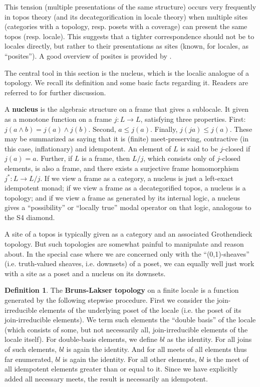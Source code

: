 \documentclass[hoptionsi,review,screen,format=acmsmall]{acmart}
\theoremstyle{definition}
\newtheorem{definition}{Definition}[section]
\begin{document}
This tension (multiple presentations of the same structure) occurs very frequently in topos theory (and its decategorification in locale theory) when multiple sites (categories with a topology, resp. posets with a coverage) can present the same topos (resp. locale). This suggests that a tighter correspondence should not be to locales directly, but rather to their presentations as sites (known, for locales, as ``posites''). A good overview of posites is provided by \cite{schultz2017temporal}.

The central tool in this section is the nucleus, which is the localic analogue of a topology. We recall its definition and some basic facts regarding it. Readers are referred to \cite{johnstone1982stone, vickers1996topology} for further discussion.

A \textbf{nucleus} is the algebraic structure on a frame that gives a sublocale. It given as a monotone function on a frame \(j : L \rightarrow L\), satisfying three properties. First: \(j(a \wedge b) = j(a) \wedge j(b)\). Second, \(a \le j(a)\). Finally, \(j(ja) \le j(a)\). These may be summarized as saying that it is (finite) meet-preserving, contractive (in this case, inflationary) and idempotent. An element of \(L\) is said to be \(j\)-closed if \(j(a)=a\). Further, if \(L\) is a frame, then \(L/j\), which consists only of \(j\)-closed elements, is also a frame, and there exists a surjective frame homomorphism \(j^* : L \rightarrow L/j\). If we view a frame as a category, a nucleus is just a left-exact idempotent monad; if we view a frame as a decategorified topos, a nucleus is a topology; and if we view a frame as generated by its internal logic, a nucleus gives a ``possibility'' or ``locally true'' modal operator on that logic, analogous to the S4 diamond.

A site of a topos is typically given as a category and an associated Grothendieck topology. But such topologies are somewhat painful to manipulate and reason about. In the special case where we are concerned only with the ``(0,1)-sheaves'' (i.e. truth-valued sheaves, i.e. downsets) of a poset, we can equally well just work with a site as a poset and a nucleus on its downsets.

\begin{definition}
The \textbf{Bruns-Lakser topology} on a finite locale is a function generated by the following stepwise procedure. First we consider the join-irreducible elements of the underlying poset of the locale (i.e. the poset of its join-irreducible elements). We term such elements the ``double basis'' of the locale (which consists of some, but not necessarily all, join-irreducible elements of the locale itself). For double-basis elements, we define \(bl\) as the identity. For all joins of such elements, \(bl\) is again the identity. And for all meets of all elements thus far enumerated, \(bl\) is again the identity. For all other elements, \(bl\) is the meet of all idempotent elements greater than or equal to it. Since we have explicitly added all necessary meets, the result is necessarily an idempotent.
\end{definition}
\end{document}
